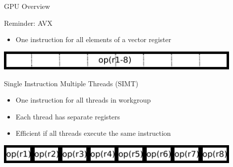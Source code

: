 \begin{frame}{GPU Overview}
 \begin{block}{Reminder: AVX}
   \begin{itemize}
    \item One instruction for all elements of a vector register
   \end{itemize}
 \end{block}

 \begin{center} \includegraphics[width=0.9\textwidth]{figures/avx} \end{center}

 \begin{block}{Single Instruction Multiple Threads (SIMT)}
  \begin{itemize}
   \item One instruction for all threads in workgroup
   \item Each thread has separate registers
   \item Efficient if all threads execute the same instruction
  \end{itemize}
 \end{block}

 \begin{center} \includegraphics[width=0.9\textwidth]{figures/simt} \end{center}

\end{frame}




